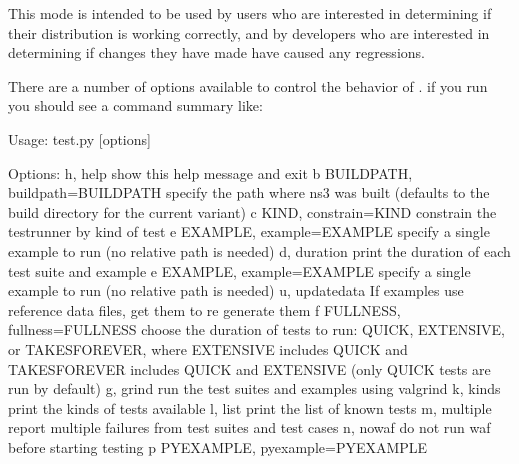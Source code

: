 \documentclass[letterpaper,10pt,english]{sphinxmanual}
\renewcommand{\sphinxcode}[1]{\texttt{\small{#1}}}
\begin{document}
This mode is intended to be used by users who are interested in determining if
their distribution is working correctly, and by developers who are interested
in determining if changes they have made have caused any regressions.

There are a number of options available to control the behavior of \sphinxcode{}.
if you run \sphinxcode{\sphinxupquote{test.py \sphinxhyphen{}\sphinxhyphen{}help}} you should see a command summary like:

\begin{sphinxVerbatim}[commandchars=\\\{\}]
Usage: test.py [options]

Options:
  \PYGZhy{}h, \PYGZhy{}\PYGZhy{}help            show this help message and exit
  \PYGZhy{}b BUILDPATH, \PYGZhy{}\PYGZhy{}buildpath=BUILDPATH
                        specify the path where ns\PYGZhy{}3 was built (defaults to the
                        build directory for the current variant)
  \PYGZhy{}c KIND, \PYGZhy{}\PYGZhy{}constrain=KIND
                        constrain the test\PYGZhy{}runner by kind of test
  \PYGZhy{}e EXAMPLE, \PYGZhy{}\PYGZhy{}example=EXAMPLE
                        specify a single example to run (no relative path is
                        needed)
  \PYGZhy{}d, \PYGZhy{}\PYGZhy{}duration        print the duration of each test suite and example
  \PYGZhy{}e EXAMPLE, \PYGZhy{}\PYGZhy{}example=EXAMPLE
                        specify a single example to run (no relative path is
                        needed)
  \PYGZhy{}u, \PYGZhy{}\PYGZhy{}update\PYGZhy{}data     If examples use reference data files, get them to re\PYGZhy{}
                        generate them
  \PYGZhy{}f FULLNESS, \PYGZhy{}\PYGZhy{}fullness=FULLNESS
                        choose the duration of tests to run: QUICK, EXTENSIVE,
                        or TAKES\PYGZus{}FOREVER, where EXTENSIVE includes QUICK and
                        TAKES\PYGZus{}FOREVER includes QUICK and EXTENSIVE (only QUICK
                        tests are run by default)
  \PYGZhy{}g, \PYGZhy{}\PYGZhy{}grind           run the test suites and examples using valgrind
  \PYGZhy{}k, \PYGZhy{}\PYGZhy{}kinds           print the kinds of tests available
  \PYGZhy{}l, \PYGZhy{}\PYGZhy{}list            print the list of known tests
  \PYGZhy{}m, \PYGZhy{}\PYGZhy{}multiple        report multiple failures from test suites and test
                        cases
  \PYGZhy{}n, \PYGZhy{}\PYGZhy{}nowaf           do not run waf before starting testing
  \PYGZhy{}p PYEXAMPLE, \PYGZhy{}\PYGZhy{}pyexample=PYEXAMPLE

\end{sphinxVerbatim}
\end{document}
